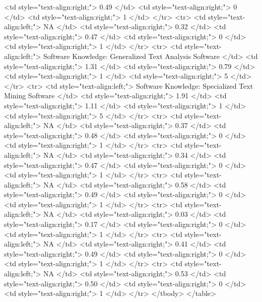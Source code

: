    <td style="text-align:right;"> 0.49 </td>
   <td style="text-align:right;"> 0 </td>
   <td style="text-align:right;"> 1 </td>
  </tr>
  <tr>
   <td style="text-align:left;"> NA </td>
   <td style="text-align:right;"> 0.32 </td>
   <td style="text-align:right;"> 0.47 </td>
   <td style="text-align:right;"> 0 </td>
   <td style="text-align:right;"> 1 </td>
  </tr>
  <tr>
   <td style="text-align:left;"> Software Knowledge: Generalized Text Analysis Software </td>
   <td style="text-align:right;"> 1.31 </td>
   <td style="text-align:right;"> 0.79 </td>
   <td style="text-align:right;"> 1 </td>
   <td style="text-align:right;"> 5 </td>
  </tr>
  <tr>
   <td style="text-align:left;"> Software Knowledge: Specialized Text Mining Software </td>
   <td style="text-align:right;"> 1.91 </td>
   <td style="text-align:right;"> 1.11 </td>
   <td style="text-align:right;"> 1 </td>
   <td style="text-align:right;"> 5 </td>
  </tr>
  <tr>
   <td style="text-align:left;"> NA </td>
   <td style="text-align:right;"> 0.37 </td>
   <td style="text-align:right;"> 0.48 </td>
   <td style="text-align:right;"> 0 </td>
   <td style="text-align:right;"> 1 </td>
  </tr>
  <tr>
   <td style="text-align:left;"> NA </td>
   <td style="text-align:right;"> 0.34 </td>
   <td style="text-align:right;"> 0.47 </td>
   <td style="text-align:right;"> 0 </td>
   <td style="text-align:right;"> 1 </td>
  </tr>
  <tr>
   <td style="text-align:left;"> NA </td>
   <td style="text-align:right;"> 0.58 </td>
   <td style="text-align:right;"> 0.49 </td>
   <td style="text-align:right;"> 0 </td>
   <td style="text-align:right;"> 1 </td>
  </tr>
  <tr>
   <td style="text-align:left;"> NA </td>
   <td style="text-align:right;"> 0.03 </td>
   <td style="text-align:right;"> 0.17 </td>
   <td style="text-align:right;"> 0 </td>
   <td style="text-align:right;"> 1 </td>
  </tr>
  <tr>
   <td style="text-align:left;"> NA </td>
   <td style="text-align:right;"> 0.41 </td>
   <td style="text-align:right;"> 0.49 </td>
   <td style="text-align:right;"> 0 </td>
   <td style="text-align:right;"> 1 </td>
  </tr>
  <tr>
   <td style="text-align:left;"> NA </td>
   <td style="text-align:right;"> 0.53 </td>
   <td style="text-align:right;"> 0.50 </td>
   <td style="text-align:right;"> 0 </td>
   <td style="text-align:right;"> 1 </td>
  </tr>
</tbody>
</table>
